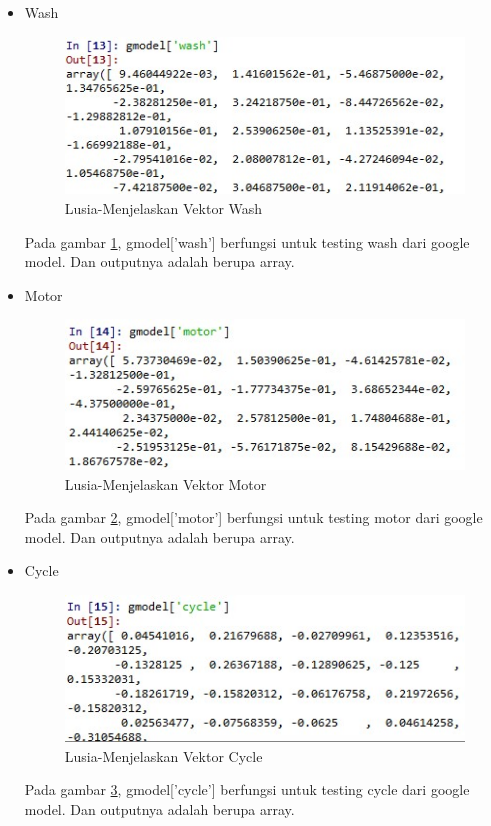 \begin{enumerate}
\begin{enumerate}
\begin{itemize}
				\item Wash
					\begin{figure}[ht]
					\centering
					\includegraphics[scale=0.45]{figures/chap5i.jpg}
					\caption{Lusia-Menjelaskan Vektor Wash}
					\label{5b10}
					\end{figure}
					\par Pada gambar \ref{5b10}, gmodel['wash'] berfungsi untuk testing wash dari google model. Dan outputnya adalah berupa array. 
					
				\item Motor
					\begin{figure}[ht]
					\centering
					\includegraphics[scale=0.45]{figures/chap5j.jpg}
					\caption{Lusia-Menjelaskan Vektor Motor}
					\label{5b11}
					\end{figure}
					\par Pada gambar \ref{5b11}, gmodel['motor'] berfungsi untuk testing motor dari google model. Dan outputnya adalah berupa array. 
					
				\item Cycle
					\begin{figure}[ht]
					\centering
					\includegraphics[scale=0.45]{figures/chap5k.jpg}
					\caption{Lusia-Menjelaskan Vektor Cycle}
					\label{5b12}
					\end{figure}
					\par Pada gambar \ref{5b12}, gmodel['cycle'] berfungsi untuk testing cycle dari google model. Dan outputnya adalah berupa array. 
			\end{itemize}
			

\end{enumerate}
\end{enumerate}
